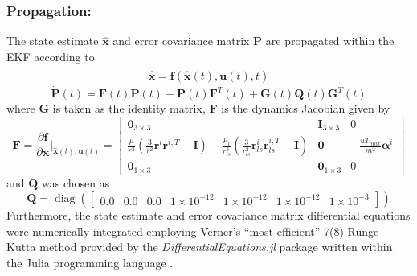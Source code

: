 \documentclass[letterpaper, paper,11pt]{AAS}		%
\begin{document}
 \subsubsection{Propagation:}
The state estimate $\hat{\mathbf{x}}$ and error covariance matrix $\mathbf{P}$ are propagated within the EKF according to \cite{Crassidis_2004}
 \begin{align}
 	\dot{\hat{\mathbf{x}}} = \mathbf{f}(\hat{\mathbf{x}}(t), \mathbf{u}(t),t)
 \end{align}
\begin{equation}
	\dot{\mathbf{P}}(t) = \mathbf{F}(t)\mathbf{P}(t) + \mathbf{P}(t)\mathbf{F}^T(t) + \mathbf{G}(t)\mathbf{Q}(t)\mathbf{G}^T(t)
\end{equation}
where $\mathbf{G}$ is taken as the identity matrix, $\mathbf{F}$ is the dynamics Jacobian given by 
\begin{equation}
	\mathbf{F} = \frac{\partial \mathbf{f}}{\partial \mathbf{x}}\bigg|_{\hat{\mathbf{x}}(t),\mathbf{u}(t)} = \begin{bmatrix}
		\mathbf{0}_{3\times 3} & \mathbf{I}_{3\times3} & 0 \\
		\frac{\mu}{r^3}\left(\frac{3}{r^2}\mathbf{r}^i\mathbf{r}^{i,T} - \mathbf{I}\right) + \frac{\mu_l}{r_{ls}^3}\left(\frac{3}{r_{ls}^2}\mathbf{r}_{ls}^i\mathbf{r}_{ls}^{i,T} - \mathbf{I}\right)  & \mathbf{0} & -\frac{uT_{max}}{m^2}\mathbf{\alpha}^i \\
		\mathbf{0}_{1\times 3} & \mathbf{0}_{1\times 3} & 0
	\end{bmatrix}
\end{equation}
and $\mathbf{Q}$ was chosen as 
\begin{equation}
	\mathbf{Q} = \operatorname{diag}\left(\begin{bmatrix}
		0.0 & 0.0 & 0.0 & 1\times10^{-12} & 1\times10^{-12} & 1\times10^{-12} & 1\times10^{-3}
	\end{bmatrix} \right)
\end{equation}
Furthermore, the state estimate and error covariance matrix differential equations were numerically integrated employing Verner's ``most efficient'' 7(8) Runge-Kutta method \cite{Verner_2010} provided by the \textit{DifferentialEquations.jl} \cite{Rackauckas_2017} package written within the Julia programming language \cite{Bezanson_2017}.
\end{document}
